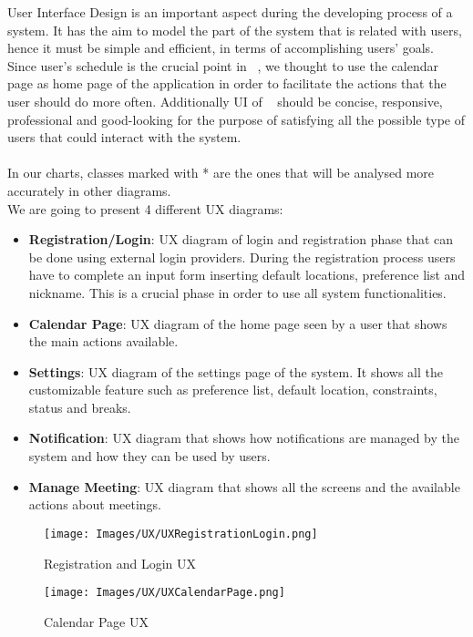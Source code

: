 User Interface Design is an important aspect during the developing process of a system. It has the aim to model the part of the system that is related with users, hence it must be simple and efficient, in terms of accomplishing users' goals. Since user's schedule is the crucial point in \projectname~, we thought to use the calendar page as home page of the application in order to facilitate the actions that the user should do more often. Additionally UI of \projectname~ should be concise, responsive, professional and good-looking for the purpose of satisfying all the possible type of users that could interact with the system.\\
\\
In our charts, classes marked with * are the ones that will be analysed more accurately in other diagrams.\\
We are going to present 4 different UX diagrams:
\begin{itemize}
	\item{\textbf{Registration/Login}}: UX diagram of login and registration phase that can be done using external login providers. During the registration process users have to complete an input form inserting default locations, preference list and nickname. This is a crucial phase in order to use all system functionalities.
	\item{\textbf{Calendar Page}}: UX diagram of the home page seen by a user that shows the main actions available.
	\item{\textbf{Settings}}: UX diagram of the settings page of the system. It shows all the customizable feature such as preference list, default location, constraints, status and breaks.
	\item{\textbf{Notification}}: UX diagram that shows how notifications are managed by the system and how they can be used by users.
	\item{\textbf{Manage Meeting}}: UX diagram that shows all the screens and the available actions about meetings.
\end{itemize}

\begin{figure}[h]
	\centering\texttt{[image: Images/UX/UXRegistrationLogin.png]}{}
	\caption{Registration and Login UX}
\end{figure}

\begin{figure}[h]
	\centering\texttt{[image: Images/UX/UXCalendarPage.png]}{}
	\caption{Calendar Page UX}
\end{figure}

